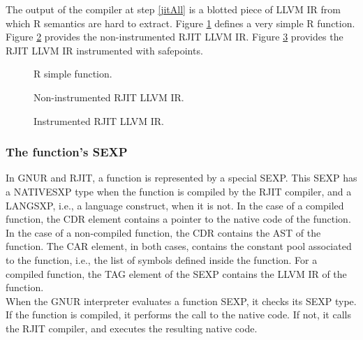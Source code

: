 The output of the compiler at step \ref{jitAll} is a blotted piece of LLVM IR from which R semantics are hard to extract.
Figure \ref{fig:RSimpleFunction} defines a very simple R function.
Figure \ref{fig:noninstrumentedir} provides the non-instrumented RJIT LLVM IR.
Figure \ref{fig:instrumentedir} provides the RJIT LLVM IR instrumented with safepoints.\\

\begin{figure}[h]
        \caption{R simple function.}
        \label{fig:RSimpleFunction}
\end{figure}

\begin{figure}[h]
    \caption{Non-instrumented RJIT LLVM IR.}
    \label{fig:noninstrumentedir}
\end{figure}

\clearpage
\begin{landscape}
\begin{figure}[h]
    \caption{Instrumented RJIT LLVM IR.}
\label{fig:instrumentedir}
\end{figure}
\end{landscape}
\clearpage


\subsubsection{The function's SEXP}
In GNUR and RJIT, a function is represented by a special SEXP. 
This SEXP has a NATIVESXP type when the function is compiled by the RJIT compiler, and a LANGSXP, i.e., a language construct, when it is not.
In the case of a compiled function, the CDR element contains a pointer to the native code of the function.
In the case of a non-compiled function, the CDR contains the AST of the function.
The CAR element, in both cases, contains the constant pool associated to the function, i.e., the list of symbols defined inside the function.
For a compiled function, the TAG element of the SEXP contains the LLVM IR of the function.\\

When the GNUR interpreter evaluates a function SEXP, it checks its SEXP type. 
If the function is compiled, it performs the call to the native code. 
If not, it calls the RJIT compiler, and executes the resulting native code.\\

